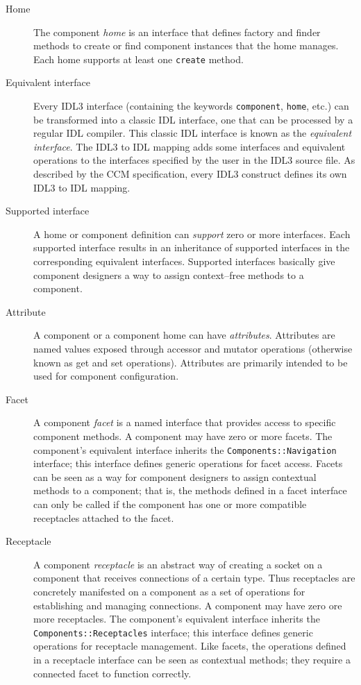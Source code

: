 \begin{description}
\item [Home]
The component {\it home} is an interface that defines factory and finder methods
to create or find component instances that the home manages. Each home supports
at least one {\tt create} method.

\item [Equivalent interface]
Every IDL3 interface (containing the keywords {\tt component}, {\tt home}, etc.)
can be transformed into a classic IDL interface, one that can be processed by a
regular IDL compiler. This classic IDL interface is known as the {\it equivalent
interface\/}. The IDL3 to IDL mapping adds some interfaces and equivalent
operations to the interfaces specified by the user in the IDL3 source file. As
described by the CCM specification, every IDL3 construct defines its own IDL3 to
IDL mapping.

\item [Supported interface]
A home or component definition can {\it support} zero or more interfaces. Each
supported interface results in an inheritance of supported interfaces in the
corresponding equivalent interfaces. Supported interfaces basically give
component designers a way to assign context--free methods to a component.

\item [Attribute]
A component or a component home can have {\it attributes\/}. Attributes are
named values exposed through accessor and mutator operations (otherwise known as
get and set operations). Attributes are primarily intended to be used for
component configuration.

\item [Facet]
A component {\it facet} is a named interface that provides access to specific
component methods. A component may have zero or more facets. The component's
equivalent interface inherits the {\tt Components::Navigation} interface; this
interface defines generic operations for facet access. Facets can be seen as a
way for component designers to assign contextual methods to a component; that
is, the methods defined in a facet interface can only be called if the component
has one or more compatible receptacles attached to the facet.

\item [Receptacle]
A component {\it receptacle} is an abstract way of creating a socket on a
component that receives connections of a certain type. Thus receptacles are
concretely manifested on a component as a set of operations for establishing and
managing connections. A component may have zero ore more receptacles. The
component's equivalent interface inherits the {\tt Components::Receptacles}
interface; this interface defines generic operations for receptacle management.
Like facets, the operations defined in a receptacle interface can be seen as
contextual methods; they require a connected facet to function correctly.


\end{description}
